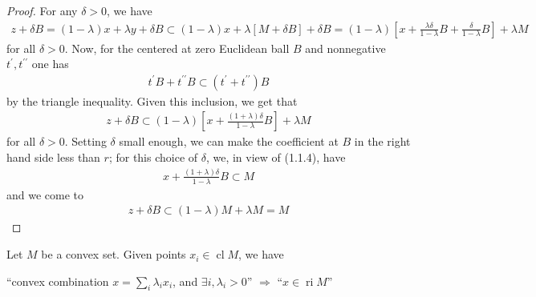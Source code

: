 \documentclass{article}
\newcommand{\cl}{\operatorname{cl}}
\newcommand{\ri}{\operatorname{ri}}
\begin{document}
\begin{proof}
For any $\delta>0$, we have 
\begin{align*}
z+\delta B = (1-\lambda) x+\lambda y+\delta B \subset(1-\lambda) x+\lambda[M+\delta B]+\delta B=(1-\lambda)\left[x+\frac{\lambda \delta}{1-\lambda} B+\frac{\delta}{1-\lambda} B\right]+\lambda M
\end{align*}
for all $\delta>0$. Now, for the centered at zero Euclidean ball $B$ and nonnegative $t^{\prime}, t^{\prime \prime}$ one has
\begin{align*}
t^{\prime} B+t^{\prime \prime} B \subset\left(t^{\prime}+t^{\prime \prime}\right) B
\end{align*}
by the triangle inequality. Given this inclusion, we get that 
\begin{align*}
z+\delta B \subset(1-\lambda)\left[x+\frac{(1+\lambda) \delta}{1-\lambda} B\right]+\lambda M
\end{align*}
for all $\delta>0$. Setting $\delta$ small enough, we can make the coefficient at $B$ in the right hand side less than $r$; for this choice of $\delta$, we, in view of (1.1.4), have
\begin{align*}
x+\frac{(1+\lambda) \delta}{1-\lambda} B \subset M
\end{align*}
and we come to
\begin{align*}
z+\delta B \subset(1-\lambda) M+\lambda M=M
\end{align*}
\end{proof} 
\begin{cora}\label{cora:pos_int}
Let $M$ be a convex set. Given points $x_{i} \in \cl M$, we have\vspace{0.2cm}

\centerline{``convex combination $x = \sum_{i} \lambda_{i} x_{i}$,  and $\exists i, \lambda_i>0$'' $\Longrightarrow$  ``$x\in \ri M$''}
\end{cora}
\end{document}
